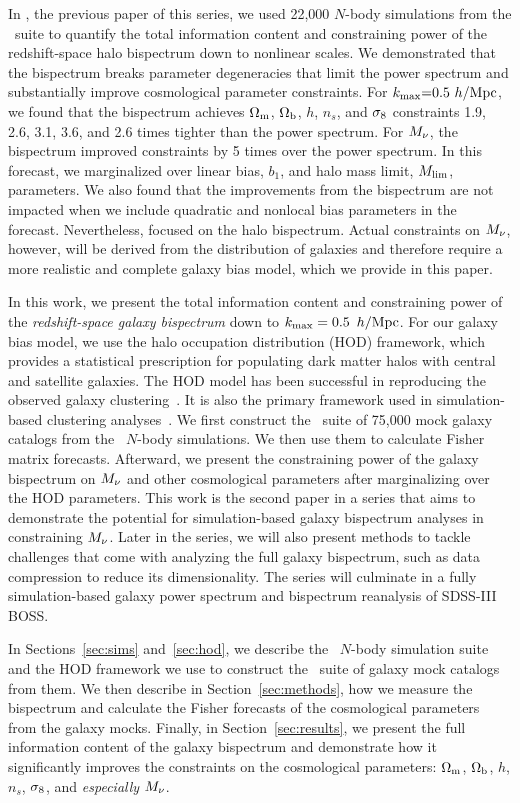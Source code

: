 In \cite{hahn2020}, the previous paper of this series, we used 22,000 $N$-body
simulations from the \quij~suite to quantify the total information content and
constraining power of the redshift-space halo bispectrum down to nonlinear scales. 
We demonstrated that the bispectrum breaks parameter degeneracies that limit
the power spectrum and substantially improve cosmological parameter constraints.
For $k_{\rm max}{=}0.5~h/{\rm Mpc}$, we found that the bispectrum achieves $\Omega_{\rm m}$,
$\Omega_{\rm b}$, $h$, $n_s$, and $\sigma_8$ constraints 1.9, 2.6, 3.1, 3.6, and 2.6 times
tighter than the power spectrum. For $M_\nu$, the bispectrum improved 
constraints by 5 times over the power spectrum. In this forecast, we marginalized 
over linear bias, $b_1$, and halo mass limit, $M_{\rm lim}$, parameters. We also found that the
improvements from the bispectrum are not impacted when we include quadratic 
and nonlocal bias parameters in the forecast. Nevertheless, \cite{hahn2020}
focused on the halo bispectrum. Actual constraints on $M_\nu$, however, will be 
derived from the distribution of galaxies and therefore require a more 
realistic and complete galaxy bias model, which we provide in this paper.

In this work, we present the total information content and constraining power
of the {\em redshift-space galaxy bispectrum} down to $k_{\rm max}= 0.5~\,h/\mathrm{Mpc}$. For our galaxy
bias model, we use the halo occupation distribution (HOD) framework, which provides a
statistical prescription for populating dark matter halos with central and satellite
galaxies. The HOD model has been successful in reproducing the observed galaxy
clustering~\citep[\emph{e.g.}][]{zheng2005, leauthaud2012, tinker2013, zentner2016, vakili2019}. 
It is also the primary framework used in simulation-based clustering
analyses~\citep[\eg][]{mcclintock2018, zhai2019, lange2019, wibking2019}. 
We first construct the \molino~suite of 75,000 mock galaxy catalogs from the \quij~$N$-body
simulations. We then use them to calculate Fisher matrix forecasts. Afterward, we
present the constraining power of the galaxy bispectrum on $M_\nu$ and other 
cosmological parameters after marginalizing over the HOD parameters. This work
is the second paper in a series that aims to demonstrate the potential for
simulation-based galaxy bispectrum analyses in constraining $M_\nu$. Later in
the series, we will also present methods to tackle challenges that come with
analyzing the full galaxy bispectrum, such as data compression to reduce its
dimensionality. The series will culminate in a fully simulation-based galaxy
power spectrum and bispectrum reanalysis of SDSS-III BOSS. 

In Sections~\ref{sec:sims} and~\ref{sec:hod}, we describe the \quij~$N$-body simulation 
suite and the HOD framework we use to construct the \molino~suite of galaxy mock 
catalogs from them.  We then describe in Section~\ref{sec:methods}, how we measure the bispectrum and
calculate the Fisher forecasts of the cosmological parameters from the galaxy
mocks. Finally, in Section~\ref{sec:results}, we present the full information
content of the galaxy bispectrum and demonstrate how it significantly improves
the constraints on the cosmological parameters: $\Omega_{\rm m}$, $\Omega_{\rm b}$, $h$, $n_s$,
$\sigma_8$, and {\em especially} $M_\nu$. 
